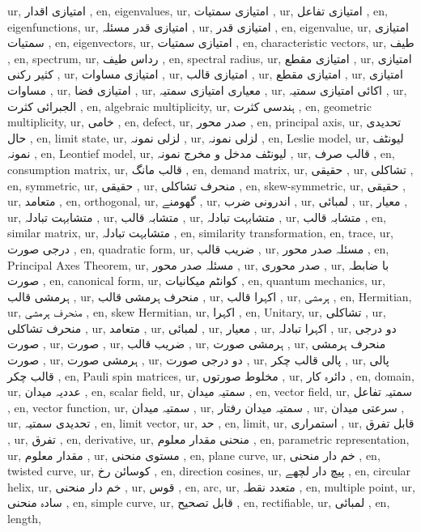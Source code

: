 ur, امتیازی اقدار ,
en, eigenvalues,
ur, امتیازی سمتیات ,
ur, امتیازی تفاعل ,
en, eigenfunctions,
ur, امتیازی قدر مسئلہ ,
ur, امتیازی قدر ,
en, eigenvalue,
ur, امتیازی سمتیات ,
en, eigenvectors,
ur, امتیازی سمتیات ,
en, characteristic vectors,
ur, طیف ,
en, spectrum,
ur, رداس طیف ,
en, spectral radius,
ur, امتیازی مقطع ,
ur, امتیازی کثیر رکنی ,
ur, امتیازی مساوات ,
ur, امتیازی قالب ,
ur, امتیازی مقطع ,
ur, امتیازی مساوات ,
ur, امتیازی فضا ,
ur, معیاری امتیازی سمتیہ ,
ur, اکائی امتیازی سمتیہ ,
ur, الجبرائی کثرت ,
en, algebraic multiplicity,
ur, ہندسی کثرت ,
en, geometric multiplicity,
ur, خامی ,
en, defect,
ur, صدر محور ,
en, principal axis,
ur, تحدیدی حال ,
en, limit state,
ur, لزلی نمونہ ,
ur, لزلی نمونہ ,
en, Leslie model,
ur, لیونٹف نمونہ ,
en, Leontief model,
ur, لیونٹف مدخل و مخرج نمونہ ,
ur, قالب صرف ,
en, consumption matrix,
ur, قالب مانگ ,
en, demand matrix,
ur, حقیقی ,
ur, تشاکلی ,
en, symmetric,
ur, حقیقی ,
ur, منحرف تشاکلی ,
en, skew-symmetric,
ur, حقیقی ,
ur, متعامد ,
en, orthogonal,
ur, گھومنے ,
ur, اندرونی ضرب ,
ur, لمبائی ,
ur, معیار ,
ur, متشابہت تبادلہ ,
ur, متشابہ قالب ,
ur, متشابہت تبادلہ ,
ur, متشابہ قالب ,
en, similar matrix,
ur, متشابہت تبادلہ ,
en, similarity transformation,
en, trace,
ur, درجی صورت ,
en, quadratic form,
ur,  ضریب قالب ,
ur, مسئلہ صدر محور ,
en, Principal Axes Theorem,
ur, مسئلہ صدر محور ,
ur, صدر محوری ,
ur, با ضابطہ صورت ,
en, canonical form,
ur, کوانٹم میکانیات ,
en, quantum mechanics,
ur, ہرمشی قالب ,
ur, منحرف ہرمشی قالب ,
ur, اکہرا قالب ,
ur, ہرمشی ,
en, Hermitian,
ur, منحرف ہرمشی ,
en, skew Hermitian,
ur, اکہرا ,
en, Unitary,
ur, تشاکلی ,
ur, منحرف تشاکلی ,
ur, متعامد ,
ur, لمبائی ,
ur, معیار ,
ur, اکہرا تبادلہ ,
ur, دو درجی صورت ,
ur, صورت ,
ur,  ضریب قالب ,
ur, ہرمشی صورت ,
ur, منحرف ہرمشی صورت ,
ur, ہرمشی صورت ,
ur, دو درجی صورت ,
ur, پالی قالب چکر ,
ur, پالی قالب چکر ,
en, Pauli spin matrices,
ur, مخلوط صورتوں ,
ur, دائرہ کار ,
en, domain,
ur, عددیہ میدان ,
en, scalar field,
ur, سمتیہ میدان ,
en, vector field,
ur, سمتیہ تفاعل ,
en, vector function,
ur, سمتیہ میدان ,
ur, سمتیہ میدان رفتار ,
ur, سرعتی میدان ,
ur, تحدیدی سمتیہ ,
en, limit vector,
ur, حد ,
en, limit,
ur, استمراری ,
ur, قابل تفرق ,
ur, تفرق ,
en, derivative,
ur, منحنی مقدار معلوم ,
en, parametric representation,
ur, مقدار معلوم ,
ur, مستوی منحنی ,
en, plane curve,
ur, خم دار منحنی ,
en, twisted curve,
ur, کوسائن رخ ,
en, direction cosines,
ur, پیچ دار لچھے ,
en, circular helix,
ur, خم دار منحنی ,
ur, قوس ,
en, arc,
ur, متعدد نقطہ ,
en, multiple point,
ur, سادہ منحنی ,
en, simple curve,
ur, قابل تصحیح ,
en, rectifiable,
ur, لمبائی ,
en, length,
